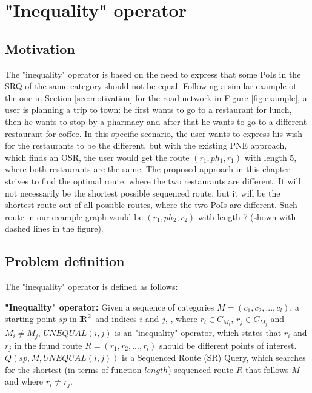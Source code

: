 


\section{"Inequality" operator}

\subsection{Motivation}
\label{sec:motNEO}
The "inequality" operator is based on the need to express that some PoIs in the SRQ of the same category should not be equal. Following a similar example ot the one in Section \ref{sec:motivation} for the road network in Figure \ref{fig:example}, a user is planning a trip to town: he first wants to go to a restaurant for lunch, then he wants to stop by a pharmacy and after that he wants to go to a different restaurant for coffee. In this specific scenario, the user wants to express his wish for the restaurants to be the different, but with the existing PNE \cite{OSR} approach, which finds an OSR, the user would get the route $(r_1, ph_1, r_1)$ with length 5, where both restaurants are the same. The proposed approach in this chapter strives to find the optimal route, where the two restaurants are different. It will not necessarily be the shortest possible sequenced route, but it will be the shortest route out of all possible routes, where the two PoIs are different. Such route in our example graph would be $(r_1, ph_2, r_2)$ with length 7 (shown with dashed lines in the figure).

\subsection{Problem definition} 
\label{sec:problemNEO}
The "inequality" operator is defined as follows:

\textbf{"Inequality" operator:} Given a sequence of categories $M = (c_1, c_2, ..., c_l)$, a starting point $sp$ in ${\rm I\!R}^2$ and indices $i$ and $j$, , where $r_i \in C_{M_{i}}$, $r_j \in C_{M_{j}}$ and $M_i \neq M_j$, $UNEQUAL(i, j)$ is an "inequality" operator, which states that $r_i$ and $r_j$ in the found route $R = (r_1, r_2, ..., r_l)$ should be different points of interest.
$Q(sp, M, UNEQUAL(i, j))$ is a Sequenced Route (SR) Query, which searches for the shortest (in terms of function $length$) sequenced route $R$ that follows $M$ and where $r_i \neq r_j$.

